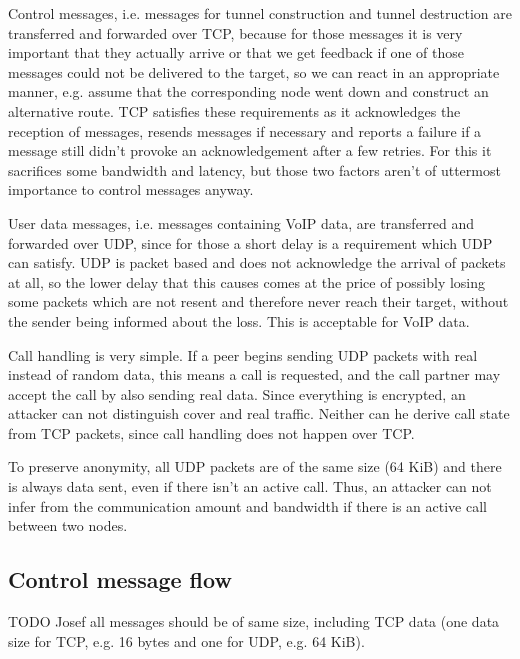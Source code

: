 \documentclass{article}
\begin{document}
Control messages, i.e. messages for tunnel construction and tunnel destruction are transferred and forwarded over TCP, because for those messages it is very important that they actually arrive or that we get feedback if one of those messages could not be delivered to the target, so we can react in an appropriate manner, e.g. assume that the corresponding node went down and construct an alternative route. TCP satisfies these requirements as it acknowledges the reception of messages, resends messages if necessary and reports a failure if a message still didn't provoke an acknowledgement after a few retries. For this it sacrifices some bandwidth and latency, but those two factors aren't of uttermost importance to control messages anyway. 

User data messages, i.e. messages containing VoIP data, are transferred and forwarded over UDP, since for those a short delay is a requirement which UDP can satisfy. UDP is packet based and does not acknowledge the arrival of packets at all, so the lower delay that this causes comes at the price of possibly losing some packets which are not resent and therefore never reach their target, without the sender being informed about the loss. This is acceptable for VoIP data.

Call handling is very simple. If a peer begins sending UDP packets with real instead of random data, this means a call is requested, and the call partner may accept the call by also sending real data. Since everything is encrypted, an attacker can not distinguish cover and real traffic. Neither can he derive call state from TCP packets, since call handling does not happen over TCP.

To preserve anonymity, all UDP packets are of the same size (64 KiB) and there is always data sent, even if there isn't an active call. Thus, an attacker can not infer from the communication amount and bandwidth if there is an active call between two nodes.


\subsection{Control message flow}
TODO Josef all messages should be of same size, including TCP data (one data size for TCP, e.g. 16 bytes and one for UDP, e.g. 64 KiB). 
\end{document}
